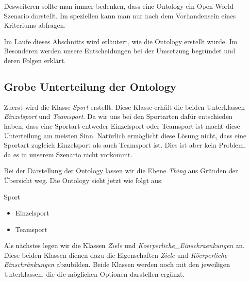 Desweiteren sollte man immer bedenken, dass eine Ontology ein Open-World-Szenario darstellt. Im speziellen kann man nur nach dem Vorhandensein eines Kriteriums abfragen.

Im Laufe dieses Abschnitts wird erl\"autert, wie die Ontology erstellt wurde. Im Besonderen werden unsere Entscheidungen bei der Umsetzung begr\"undet und deren Folgen erkl\"art.

\subsection{Grobe Unterteilung der Ontology}
Zuerst wird die Klasse \textit{Sport} erstellt. Diese Klasse erh\"alt die beiden Unterklassen \textit{Einzelsport} und \textit{Teamsport}. Da wir uns bei den Sportarten daf\"ur entschieden haben, dass eine Sportart entweder Einzelsport oder Teamsport ist macht diese Unterteilung am meisten Sinn. Nat\"urlich erm\"oglicht diese L\"osung nicht, dass eine Sportart zugleich Einzelsport als auch Teamsport ist. Dies ist aber kein Problem, da es in unserem Szenario nicht vorkommt.

Bei der Darstellung der Ontology lassen wir die Ebene \textit{Thing} aus Gr\"unden der \"Ubersicht weg.
Die Ontology sieht jetzt wie folgt aus:
\begin{capitemize}
		\item Sport
			\begin{itemize}
				\item Einzelsport
				\item Teamsport
			\end{itemize}
\end{capitemize}

Als n\"achstes legen wir die Klassen \textit{Ziele} und \textit{Koerperliche\_Einschraenkungen} an. Diese beiden Klassen dienen dazu die Eigenschaften \textit{Ziele} und \textit{K\"oerperliche Einschr\"ankungen} abzubilden. Beide Klassen werden noch mit den jeweiligen Unterklassen, die die m\"oglichen Optionen darstellen erg\"anzt.

